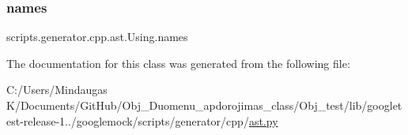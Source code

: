 \subsubsection{\texorpdfstring{names}{names}}
{\footnotesize\ttfamily scripts.\+generator.\+cpp.\+ast.\+Using.\+names}



The documentation for this class was generated from the following file\+:\begin{DoxyCompactItemize}
\item 
C\+:/\+Users/\+Mindaugas K/\+Documents/\+Git\+Hub/\+Obj\+\_\+\+Duomenu\+\_\+apdorojimas\+\_\+class/\+Obj\+\_\+test/lib/googletest-\/release-\/1../googlemock/scripts/generator/cpp/\mbox{\hyperlink{_obj__test_2lib_2googletest-release-1_88_81_2googlemock_2scripts_2generator_2cpp_2ast_8py}{ast.\+py}}\end{DoxyCompactItemize}
